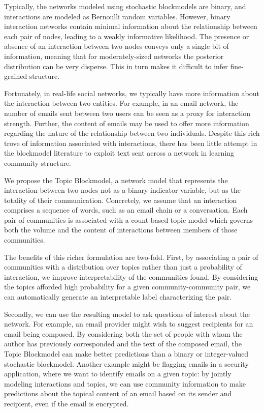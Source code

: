     Typically, the networks modeled using stochastic blockmodels are binary, and interactions are modeled as Bernoulli random variables. However, binary interaction networks contain minimal information about the relationship between each pair of nodes, leading to a weakly informative likelihood. The presence or absence of an interaction between two nodes conveys only a single bit of information, meaning that for moderately-sized networks the posterior distribution can be very disperse. This in turn makes it difficult to infer fine-grained structure.
    
    Fortunately, in real-life social networks, we typically have more information about the interaction between two entities. For example, in an email network, the number of emails sent between two users can be seen as a proxy for interaction strength. Further, the content of emails may be used to offer more information regarding the nature of the relationship between two individuals. Despite this rich trove of information associated with interactions, there has been little attempt in the blockmodel literature to exploit text sent across a network in learning community structure.
    
    We propose the Topic Blockmodel, a network model that represents the interaction between two nodes not as a binary indicator variable, but as the totality of their communication. 
    Concretely, we assume that an interaction comprises a sequence of words, such as an email chain or a conversation. 
    Each pair  of communities is associated with a count-based topic model  which governs both the volume and the content of interactions between members of those communities.

    The benefits of this richer formulation are two-fold. First, by associating a pair of communities with a distribution over topics rather than just a probability of interaction, we improve interpretability of the  communities found. By considering the topics afforded high probability for a given community-community pair, we can automatically generate an interpretable label characterizing the pair.
    
    Secondly, we can use the resulting model to ask questions of interest about the network. For example, an email provider might wish to suggest recipients for an email being composed. By considering both the set of people with whom the author has previously corresponded and the text of the composed email, the Topic Blockmodel can make better predictions than a binary or integer-valued stochastic blockmodel. Another example might be flagging emails in a security application, where we want to identify emails on a given topic: by jointly modeling interactions and topics, we can use community information to make predictions about the topical content of an email based on its sender and recipient, even if the email is encrypted.

